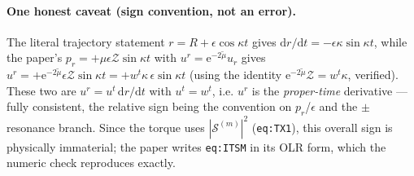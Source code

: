 \documentclass{article}
\newcommand{\rmd}{\mathrm{d}}
\newcommand{\rme}{\mathrm{e}}
\newcommand{\mass}{\mu}
\newcommand{\mmu}{\tilde\mu}
\begin{document}
\paragraph{One honest caveat (sign convention, not an error).} The literal trajectory statement
$r=R+\epsilon\cos\kappa t$ gives $\rmd r/\rmd t=-\epsilon\kappa\sin\kappa t$, while the paper's
$p_r=+\mass\epsilon\mathcal{Z}\sin\kappa t$ with $u^r=\rme^{-2\mmu}u_r$ gives
$u^r=+\rme^{-2\mmu}\epsilon\mathcal{Z}\sin\kappa t=+w^t\kappa\,\epsilon\sin\kappa t$ (using the identity
$\rme^{-2\mmu}\mathcal{Z}=w^t\kappa$, verified). These two are $u^r=u^t\,\rmd r/\rmd t$ with $u^t=w^t$, i.e.
$u^r$ is the \emph{proper-time} derivative --- fully consistent, the relative sign being the convention on
$p_r$/$\epsilon$ and the $\pm$ resonance branch. Since the torque uses $|\mathcal{S}^{(m)}|^2$
(\texttt{eq:TX1}), this overall sign is physically immaterial; the paper writes \texttt{eq:ITSM} in its OLR
form, which the numeric check reproduces exactly.
\end{document}
